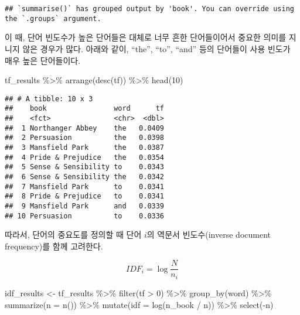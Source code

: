 \documentclass[
]{book}
\newenvironment{Shaded}{\begin{snugshade}}{\end{snugshade}}
\newcommand{\AttributeTok}[1]{\textcolor[rgb]{0.77,0.63,0.00}{#1}}
\newcommand{\DecValTok}[1]{\textcolor[rgb]{0.00,0.00,0.81}{#1}}
\newcommand{\FunctionTok}[1]{\textcolor[rgb]{0.00,0.00,0.00}{#1}}
\newcommand{\NormalTok}[1]{#1}
\newcommand{\OtherTok}[1]{\textcolor[rgb]{0.56,0.35,0.01}{#1}}
\newcommand{\SpecialCharTok}[1]{\textcolor[rgb]{0.00,0.00,0.00}{#1}}
\begin{document}
\begin{verbatim}
## `summarise()` has grouped output by 'book'. You can override using the `.groups` argument.
\end{verbatim}

이 때, 단어 빈도수가 높은 단어들은 대체로 너무 흔한 단어들이어서 중요한 의미를 지니지 않은 경우가 많다. 아래와 같이, ``the'', ``to'', ``and'' 등의 단어들이 사용 빈도가 매우 높은 단어들이다.

\begin{Shaded}
\begin{Highlighting}[]
\NormalTok{tf\_results }\SpecialCharTok{\%\textgreater{}\%} \FunctionTok{arrange}\NormalTok{(}\FunctionTok{desc}\NormalTok{(tf)) }\SpecialCharTok{\%\textgreater{}\%} \FunctionTok{head}\NormalTok{(}\DecValTok{10}\NormalTok{)}
\end{Highlighting}
\end{Shaded}

\begin{verbatim}
## # A tibble: 10 x 3
##    book                word      tf
##    <fct>               <chr>  <dbl>
##  1 Northanger Abbey    the   0.0409
##  2 Persuasion          the   0.0398
##  3 Mansfield Park      the   0.0387
##  4 Pride & Prejudice   the   0.0354
##  5 Sense & Sensibility to    0.0343
##  6 Sense & Sensibility the   0.0342
##  7 Mansfield Park      to    0.0341
##  8 Pride & Prejudice   to    0.0341
##  9 Mansfield Park      and   0.0339
## 10 Persuasion          to    0.0336
\end{verbatim}

따라서, 단어의 중요도를 정의할 때 단어 \(i\)의 역문서 빈도수(inverse document frequency)를 함께 고려한다.

\begin{equation*}
IDF_{i} = \log \frac{N}{n_i}
\end{equation*}

\begin{Shaded}
\begin{Highlighting}[]
\NormalTok{idf\_results }\OtherTok{\textless{}{-}}\NormalTok{ tf\_results }\SpecialCharTok{\%\textgreater{}\%}
  \FunctionTok{filter}\NormalTok{(tf }\SpecialCharTok{\textgreater{}} \DecValTok{0}\NormalTok{) }\SpecialCharTok{\%\textgreater{}\%}
  \FunctionTok{group\_by}\NormalTok{(word) }\SpecialCharTok{\%\textgreater{}\%}
  \FunctionTok{summarize}\NormalTok{(}\AttributeTok{n =} \FunctionTok{n}\NormalTok{()) }\SpecialCharTok{\%\textgreater{}\%}
  \FunctionTok{mutate}\NormalTok{(}\AttributeTok{idf =} \FunctionTok{log}\NormalTok{(n\_book }\SpecialCharTok{/}\NormalTok{ n)) }\SpecialCharTok{\%\textgreater{}\%}
  \FunctionTok{select}\NormalTok{(}\SpecialCharTok{{-}}\NormalTok{n)}
\end{Highlighting}
\end{Shaded}
\end{document}
